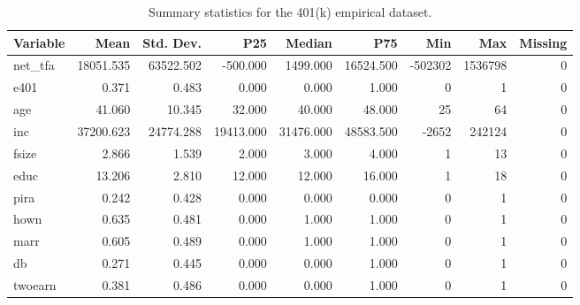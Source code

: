 \begin{table}[!htbp]
\centering
\caption{Summary statistics for the 401(k) empirical dataset.}
\label{tab:summary-401k}
\begin{tabular}{lrrrrrrrr}
 \hline
Variable & Mean & Std. Dev. & P25 & Median & P75 & Min & Max & Missing \\
 \hline
net_tfa & 18051.535 & 63522.502 & -500.000 & 1499.000 & 16524.500 & -502302 & 1536798 & 0 \\
e401 & 0.371 & 0.483 & 0.000 & 0.000 & 1.000 & 0 & 1 & 0 \\
age & 41.060 & 10.345 & 32.000 & 40.000 & 48.000 & 25 & 64 & 0 \\
inc & 37200.623 & 24774.288 & 19413.000 & 31476.000 & 48583.500 & -2652 & 242124 & 0 \\
fsize & 2.866 & 1.539 & 2.000 & 3.000 & 4.000 & 1 & 13 & 0 \\
educ & 13.206 & 2.810 & 12.000 & 12.000 & 16.000 & 1 & 18 & 0 \\
pira & 0.242 & 0.428 & 0.000 & 0.000 & 0.000 & 0 & 1 & 0 \\
hown & 0.635 & 0.481 & 0.000 & 1.000 & 1.000 & 0 & 1 & 0 \\
marr & 0.605 & 0.489 & 0.000 & 1.000 & 1.000 & 0 & 1 & 0 \\
db & 0.271 & 0.445 & 0.000 & 0.000 & 1.000 & 0 & 1 & 0 \\
twoearn & 0.381 & 0.486 & 0.000 & 0.000 & 1.000 & 0 & 1 & 0 \\
 \hline
\end{tabular}
\end{table}
